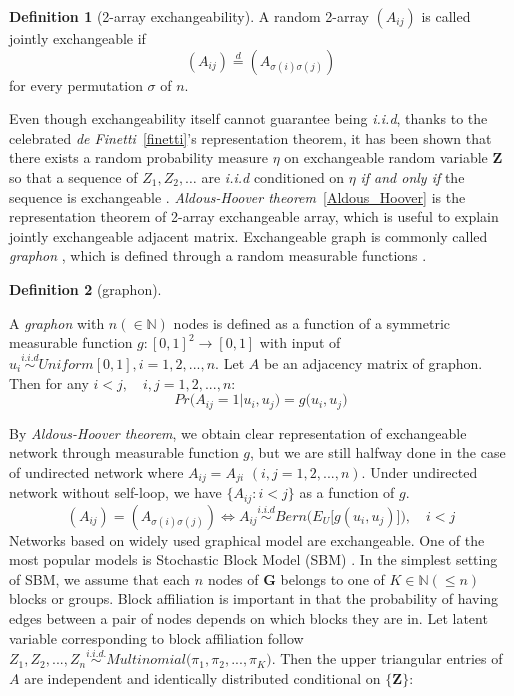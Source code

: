 \documentclass[12pt]{article}
\theoremstyle{definition}
\newtheorem{definition}{Definition}[section]
\begin{document}
\begin{definition}[2-array exchangeability]
	\label{exchangeability}
	A random 2-array $(A_{ij})$ is called jointly exchangeable if 
	$$(A_{ij}) \stackrel{d}{=} (A_{\sigma(i) \sigma(j)})$$
	for every permutation $\sigma$ of $n$.
\end{definition}
Even though exchangeability itself cannot guarantee being \textit{i.i.d}, thanks to the celebrated  \textit{de Finetti}~\ref{finetti}'s representation theorem, it has been shown that there exists a random probability measure $\eta$ on exchangeable random variable $\mathbf{Z}$ so that a sequence of $Z_{1}, Z_{2}, \ldots $ are \textit{i.i.d} conditioned on $\eta$ \textit{if and only if} the sequence is exchangeable \citep{orbanz2015bayesian, caron2014sparse}. \textit{Aldous-Hoover theorem}~\ref{Aldous_Hoover} is the representation theorem of 2-array exchangeable array, which is useful to explain jointly exchangeable adjacent matrix. Exchangeable graph is commonly called \textit{graphon} \citep{lovasz2006limits}, which is defined through a random measurable functions \citep{chan2013estimation}.	
\begin{definition}[graphon]
	\label{graphon}
		
	A \textit{graphon} with $n (\in \mathbb{N})$ nodes is defined as a function of a symmetric measurable function $g : [0,1]^2 \rightarrow [0,1]$ with input of $u_{i} \overset{i.i.d}{\sim} Uniform[0,1], i = 1,2,... ,n$. 
	Let $A$ be an adjacency matrix of graphon. Then for any $i < j, \quad i,j=1,2,...,n$:	
\begin{equation}
	Pr \big(   A_{ij} = 1 \big| u_{i}, u_{j} \big) = g \big(  u_{i}, u_{j} \big)
\end{equation}
\end{definition}
By \textit{Aldous-Hoover theorem}, we obtain clear representation of exchangeable network through measurable function $g$, but we are still halfway done in the case of undirected network where $A_{ij} = A_{ji}$  $(i,j=1,2,... , n)$.  Under undirected network without self-loop, we have $\{ A_{ij} : i < j \}$ as a function of $g$. 	
\begin{equation}
( A_{ij} )  =  (   A_{\sigma(i) \sigma(j)}  ) \Longleftrightarrow A_{ij} \overset{i.i.d}{\sim} Bern\big( E_{U} \big[  g(u_{i}, u_{j})   \big] \big),  \quad i < j
\end{equation}  	
Networks based on  widely used graphical model are exchangeable. One of the most popular models is Stochastic Block Model (SBM) \citep{holland1983stochastic}. In the simplest setting of SBM, we assume that each $n$ nodes of $\mathbf{G}$ belongs to one of $K \in \mathbb{N} (\leq n)$ blocks or groups. Block affiliation is important in that the probability of having edges between a pair of nodes depends on which blocks they are in.  Let latent variable corresponding to block affiliation follow $Z_{1}, Z_{2}, ... , Z_{n} \overset{i.i.d.}{\sim} Multinomial\big( \pi_{1}, \pi_{2}, ... , \pi_{K} \big)$. Then the upper triangular entries of $A$ are independent and identically distributed conditional on $\{\mathbf{Z}\}$:
\end{document}
